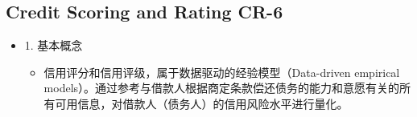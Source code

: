 
\subsection{Credit Scoring and Rating CR-6}


\begin{itemize}
    \item 1. 基本概念
    \begin{itemize}
        \item 信用评分和信用评级，属于数据驱动的经验模型（Data-driven empirical models）。通过参考与借款人根据商定条款偿还债务的能力和意愿有关的所有可用信息，对借款人（债务人）的信用风险水平进行量化。
        

\end{itemize}
\end{itemize}
